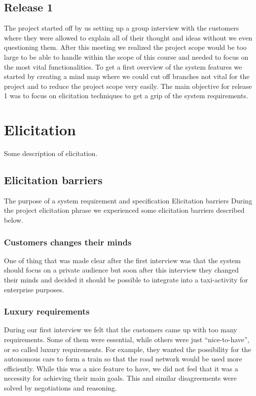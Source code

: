 \documentclass[10pt]{article}
\begin{document}
\subsection{Release 1}
The project started off by us setting up a group interview with the customers where they were allowed  to explain all of their thought and ideas without we even questioning them. After this meeting we realized the project scope would be too large to be able to handle within the scope of this course and needed to focus on the most vital functionalities.
To get a first overview of the system features we started by creating a mind map where we could cut off branches not vital for the project and to reduce the project scope very easily.
The main objective for release 1 was to focus on elicitation techniques to get a grip of the system requirements.

\section{Elicitation}
\sloppy
\noindent Some description of elicitation.
\subsection{Elicitation barriers}
The purpose of a system requirement and specification
Elicitation barriers
During the project elicitation phrase we experienced some elicitation barriers described below. 
\subsubsection{Customers changes their minds}
One of thing that was made clear after the first interview was that the system should focus on a private audience but soon after this interview they changed their minds and decided it should be possible to integrate into a taxi-activity for enterprise purposes.
\subsubsection{Luxury requirements}
During our first interview we felt that the customers came up with too many requirements. Some of them were essential, while others were just “nice-to-have”, or so called luxury requirements. For example, they wanted the possibility for the autonomous cars to form a train so that the road network would be used more efficiently. While this was a nice feature to have, we did not feel that it was a necessity for achieving their main goals. This and similar disagreements were solved by negotiations and reasoning. 
\end{document}
